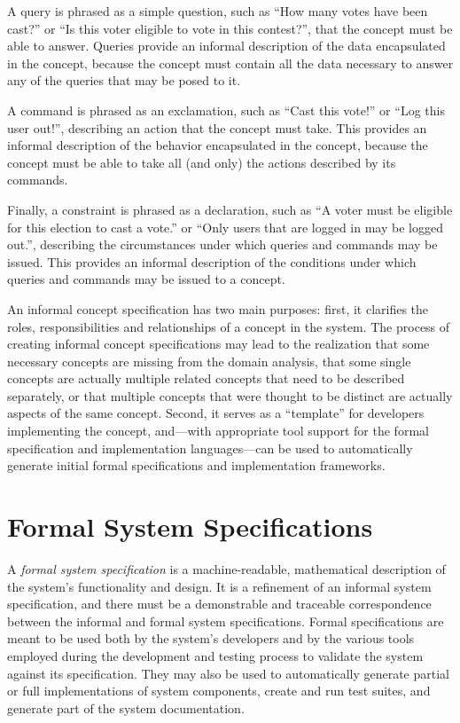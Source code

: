 A query is phrased as a simple question, such as ``How many votes have
been cast?'' or ``Is this voter eligible to vote in this contest?'',
that the concept must be able to answer. Queries provide an informal
description of the data encapsulated in the concept, because the
concept must contain all the data necessary to answer any of the
queries that may be posed to it.

A command is phrased as an exclamation, such as ``Cast this vote!'' or
``Log this user out!'', describing an action that the concept must
take. This provides an informal description of the behavior
encapsulated in the concept, because the concept must be able to take
all (and only) the actions described by its commands.

Finally, a constraint is phrased as a declaration, such as ``A voter
must be eligible for this election to cast a vote.'' or ``Only users
that are logged in may be logged out.'', describing the circumstances
under which queries and commands may be issued. This provides an
informal description of the conditions under which queries and
commands may be issued to a concept. 

An informal concept specification has two main purposes: first, it
clarifies the roles, responsibilities and relationships of a concept
in the system. The process of creating informal concept specifications
may lead to the realization that some necessary concepts are missing
from the domain analysis, that some single concepts are actually
multiple related concepts that need to be described separately, or
that multiple concepts that were thought to be distinct are actually
aspects of the same concept. Second, it serves as a ``template'' for
developers implementing the concept, and---with appropriate tool
support for the formal specification and implementation
languages---can be used to automatically generate initial formal
specifications and implementation frameworks.

\section{Formal System Specifications}

A \emph{formal system specification} is a machine-readable,
mathematical description of the system's functionality and design. It
is a refinement of an informal system specification, and there must be
a demonstrable and traceable correspondence between the informal and
formal system specifications. Formal specifications are meant to be
used both by the system's developers and by the various tools employed
during the development and testing process to validate the system
against its specification. They may also be used to automatically
generate partial or full implementations of system components, create
and run test suites, and generate part of the system documentation.

